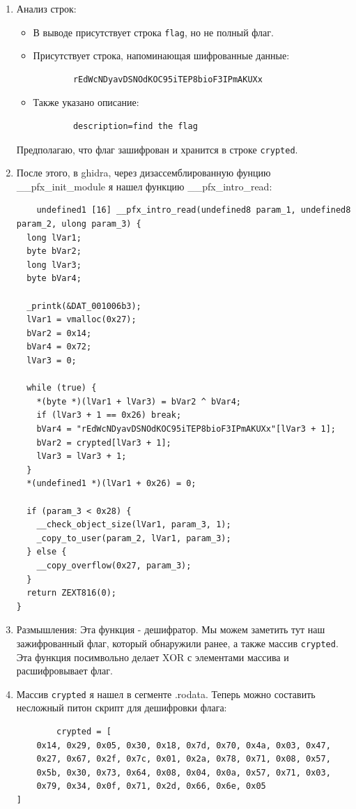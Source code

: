 \begin{enumerate}
        \item Анализ строк:
        \begin{itemize}
            \item В выводе присутствует строка \texttt{flag}, но не полный флаг.
            \item Присутствует строка, напоминающая шифрованные данные:
            \begin{verbatim}
        rEdWcNDyavDSNOdKOC95iTEP8bioF3IPmAKUXx
            \end{verbatim}
            \item Также указано описание:
            \begin{verbatim}
        description=find the flag
            \end{verbatim}
        \end{itemize}
        Предполагаю, что флаг зашифрован и хранится в строке \texttt{crypted}.

        \item После этого, в ghidra, через дизассемблированную фунцию \_\_pfx\_init\_module я нашел функцию \_\_pfx\_intro\_read:

        \begin{verbatim}
    undefined1 [16] __pfx_intro_read(undefined8 param_1, undefined8 param_2, ulong param_3) {
  long lVar1;
  byte bVar2;
  long lVar3;
  byte bVar4;

  _printk(&DAT_001006b3);
  lVar1 = vmalloc(0x27);
  bVar2 = 0x14;
  bVar4 = 0x72;
  lVar3 = 0;

  while (true) {
    *(byte *)(lVar1 + lVar3) = bVar2 ^ bVar4;
    if (lVar3 + 1 == 0x26) break;
    bVar4 = "rEdWcNDyavDSNOdKOC95iTEP8bioF3IPmAKUXx"[lVar3 + 1];
    bVar2 = crypted[lVar3 + 1];
    lVar3 = lVar3 + 1;
  }
  *(undefined1 *)(lVar1 + 0x26) = 0;

  if (param_3 < 0x28) {
    __check_object_size(lVar1, param_3, 1);
    _copy_to_user(param_2, lVar1, param_3);
  } else {
    __copy_overflow(0x27, param_3);
  }
  return ZEXT816(0);
}
        \end{verbatim}

        \item Размышления: Эта функция - дешифратор. Мы можем заметить тут наш зажифрованный флаг, который обнаружили ранее, а также массив \texttt{crypted}. Эта функция посимвольно делает XOR с элементами массива и расшифровывает флаг.

        \item Массив \texttt{crypted} я нашел в сегменте .rodata. Теперь можно составить несложный питон скрипт для дешифровки флага:
        \begin{verbatim}
        crypted = [
    0x14, 0x29, 0x05, 0x30, 0x18, 0x7d, 0x70, 0x4a, 0x03, 0x47,
    0x27, 0x67, 0x2f, 0x7c, 0x01, 0x2a, 0x78, 0x71, 0x08, 0x57,
    0x5b, 0x30, 0x73, 0x64, 0x08, 0x04, 0x0a, 0x57, 0x71, 0x03,
    0x79, 0x34, 0x0f, 0x71, 0x2d, 0x66, 0x6e, 0x05
]


\end{verbatim}
\end{enumerate}
